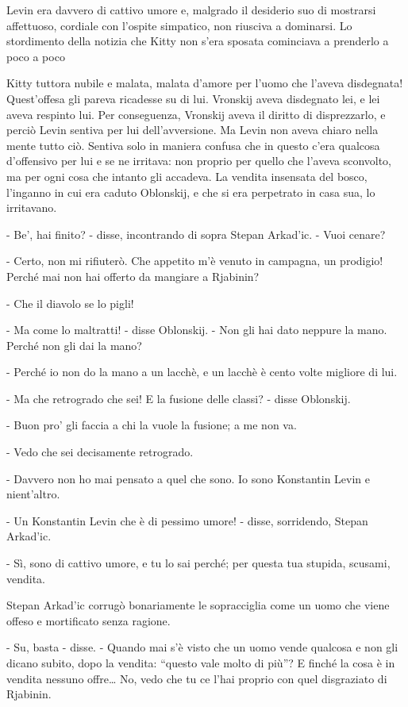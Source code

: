 Levin era davvero di cattivo umore e, malgrado il desiderio suo di mostrarsi affettuoso, cordiale con l'ospite simpatico, non riusciva a dominarsi. Lo stordimento della notizia che Kitty non s'era sposata cominciava a prenderlo a poco a poco 

Kitty tuttora nubile e malata, malata d'amore per l'uomo che l'aveva disdegnata! Quest'offesa gli pareva ricadesse su di lui. Vronskij aveva disdegnato lei, e lei aveva respinto lui. Per conseguenza, Vronskij aveva il diritto di disprezzarlo, e perciò Levin sentiva per lui dell'avversione. Ma Levin non aveva chiaro nella mente tutto ciò. Sentiva solo in maniera confusa che in questo c'era qualcosa d'offensivo per lui e se ne irritava: non proprio per quello che l'aveva sconvolto, ma per ogni cosa che intanto gli accadeva. La vendita insensata del bosco, l'inganno in cui era caduto Oblonskij, e che si era perpetrato in casa sua, lo irritavano. 

- Be', hai finito? - disse, incontrando di sopra Stepan Arkad'ic. - Vuoi cenare? 

- Certo, non mi rifiuterò. Che appetito m'è venuto in campagna, un prodigio! Perché mai non hai offerto da mangiare a Rjabinin? 

- Che il diavolo se lo pigli! 

- Ma come lo maltratti! - disse Oblonskij. - Non gli hai dato neppure la mano. Perché non gli dai la mano? 

- Perché io non do la mano a un lacchè, e un lacchè è cento volte migliore di lui. 

- Ma che retrogrado che sei! E la fusione delle classi? - disse Oblonskij. 

- Buon pro' gli faccia a chi la vuole la fusione; a me non va. 

- Vedo che sei decisamente retrogrado. 

- Davvero non ho mai pensato a quel che sono. Io sono Konstantin Levin e nient'altro. 

- Un Konstantin Levin che è di pessimo umore! - disse, sorridendo, Stepan Arkad'ic. 

- Sì, sono di cattivo umore, e tu lo sai perché; per questa tua stupida, scusami, vendita. 

Stepan Arkad'ic corrugò bonariamente le sopracciglia come un uomo che viene offeso e mortificato senza ragione. 

- Su, basta - disse. - Quando mai s'è visto che un uomo vende qualcosa e non gli dicano subito, dopo la vendita: ``questo vale molto di più''? E finché la cosa è in vendita nessuno offre\ldots{} No, vedo che tu ce l'hai proprio con quel disgraziato di Rjabinin. 

